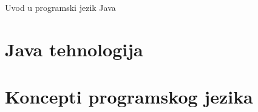 


    \frontmatter
        \pagestyle{empty}
        
        
        \tableofcontents
        \listoffigures
        \lstlistoflistings
        
    
    \mainmatter
        \pagestyle{fancy}
        \begin{part}{Uvod u programski jezik Java}
            \chapter{Java tehnologija}
            
            
            \chapter{Koncepti programskog jezika}
            
        \end{part}
        
    \pagestyle{empty}
    \backmatter
        \printbibliography[heading=bibintoc]
        \clearpage
        \printindex
        \clearpage
        \printglossary[type=\acronymtype,title=Akronimi,toctitle=Akronimi]

